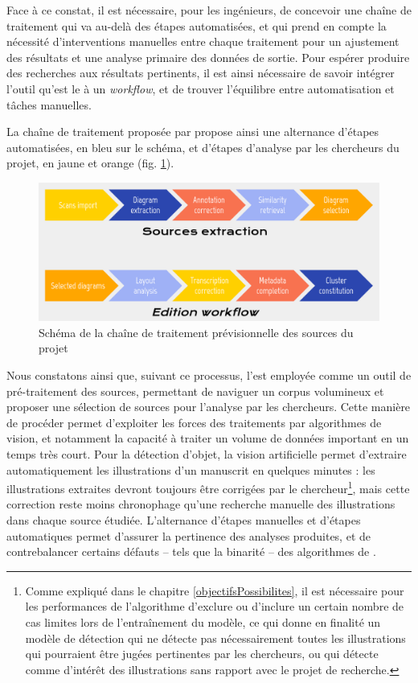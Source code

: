     Face à ce constat, il est nécessaire, pour les ingénieurs, de concevoir une chaîne de traitement qui va au-delà des étapes automatisées, et qui prend en compte la nécessité d'interventions manuelles entre chaque traitement pour un ajustement des résultats et une analyse primaire des données de sortie. Pour espérer produire des recherches aux résultats pertinents, il est ainsi nécessaire de savoir intégrer l'outil qu'est le \dl à un \textit{workflow}, et de trouver l'équilibre entre automatisation et tâches manuelles.
	
	La chaîne de traitement proposée par \eida propose ainsi une alternance d'étapes automatisées, en bleu sur le schéma, et d'étapes d'analyse par les chercheurs du projet, en jaune et orange (fig. \ref{fig:eida_workflow}).
    
    \begin{figure}[h]
    	\centering
    	\includegraphics[width=16cm]{images/eida_workflow.png}
    	\caption{Schéma de la chaîne de traitement prévisionnelle des sources du projet \eida}
    	\label{fig:eida_workflow}
    \end{figure}

	Nous constatons ainsi que, suivant ce processus, l'\ia est employée comme un outil de pré-traitement des sources, permettant de naviguer un corpus volumineux et proposer une sélection de sources pour l'analyse par les chercheurs. Cette manière de procéder permet d'exploiter les forces des traitements par algorithmes de vision, et notamment la capacité à traiter un volume de données important en un temps très court. Pour la détection d'objet, la vision artificielle permet d'extraire automatiquement les illustrations d'un manuscrit en quelques minutes : les illustrations extraites devront toujours être corrigées par le chercheur\footnote{Comme expliqué dans le chapitre \ref{objectifsPossibilites}, il est nécessaire pour les performances de l'algorithme d'exclure ou d'inclure un certain nombre de cas limites lors de l'entraînement du modèle, ce qui donne en finalité un modèle de détection qui ne détecte pas nécessairement toutes les illustrations qui pourraient être jugées pertinentes par les chercheurs, ou qui détecte comme d'intérêt des illustrations sans rapport avec le projet de recherche.}, mais cette correction reste moins chronophage qu'une recherche manuelle des illustrations dans chaque source étudiée. L'alternance d'étapes manuelles et d'étapes automatiques permet d'assurer la pertinence des analyses produites, et de contrebalancer certains défauts -- tels que la binarité -- des algorithmes de \cv.
	
